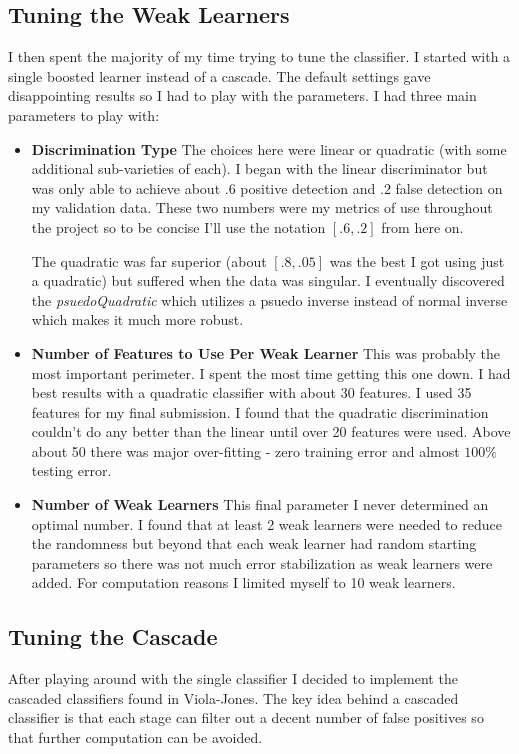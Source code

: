 \documentclass[letterpaper,12pt]{article}
\begin{document}
\subsection{Tuning the Weak Learners}
I then spent the majority of my time trying to tune the classifier. I started with a single boosted learner instead of a cascade. The default settings gave disappointing results so I had to play with the parameters. I had three main parameters to play with:

\begin{itemize}
\item
\textbf{Discrimination Type}
The choices here were linear or quadratic (with some additional sub-varieties of each). I began with the linear discriminator but was only able to achieve about $.6$ positive detection and $.2$ false detection on my validation data. These two numbers were my metrics of use
throughout the project so to be concise I'll use the notation $[.6,.2]$ from here on.

The quadratic was far superior (about $[.8,.05]$ was the best I got using just a quadratic) but suffered when the data was singular. I eventually discovered the \textit{psuedoQuadratic} which utilizes a psuedo inverse instead of normal inverse which makes it much more robust.

\item
\textbf{Number of Features to Use Per Weak Learner}
This was probably the most important perimeter. I spent the most time getting this one down. I had best results with a quadratic classifier with about 30 features. I used 35 features for my final submission. I found that the quadratic discrimination couldn't do any better than the linear until over 20 features were used. Above about 50 there was major over-fitting - zero training error and almost $100\%$ testing error.

\item
\textbf{Number of Weak Learners}
This final parameter I never determined an optimal number. I found that at least 2 weak learners were needed to reduce the randomness but beyond that each weak learner had random starting parameters so there was not much error stabilization as weak learners were added. For computation reasons I limited myself to 10 weak learners.

\end{itemize}

\subsection{Tuning the Cascade}
After playing around with the single classifier I decided to implement the cascaded classifiers found in Viola-Jones. The key idea behind a cascaded classifier is that each stage can filter out a decent number of false positives so that further computation can be avoided.
\end{document}
